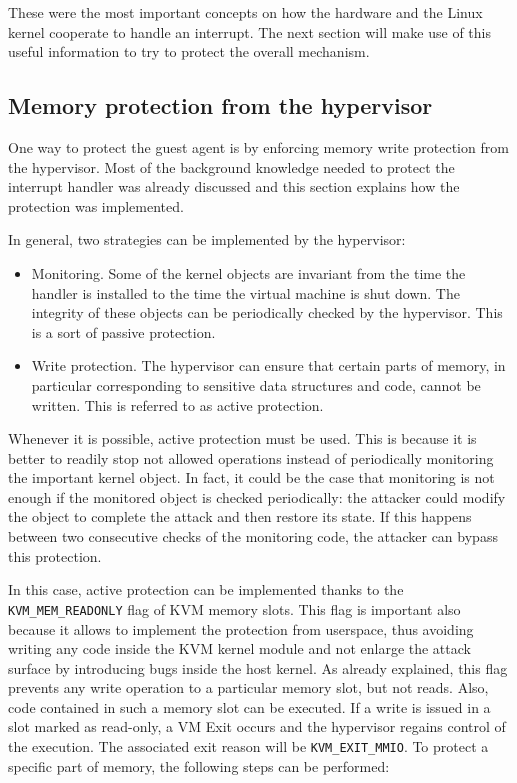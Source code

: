 \par 
These were the most important concepts on how the hardware and the Linux kernel cooperate to handle an interrupt. The next section will make use of this useful information to try to protect the overall mechanism. 
\subsection{Memory protection from the hypervisor}
One way to protect the guest agent is by enforcing memory write protection from the hypervisor. Most of the background knowledge needed to protect the interrupt handler was already discussed and this section explains how the protection was implemented.
\par 
In general, two strategies can be implemented by the hypervisor:
\begin{itemize}
    \item Monitoring. Some of the kernel objects are invariant from the time the handler is installed to the time the virtual machine is shut down. The integrity of these objects can be periodically checked by the hypervisor. This is a sort of passive protection. 
    \item Write protection. The hypervisor can ensure that certain parts of memory, in particular corresponding to sensitive data structures and code, cannot be written. This is referred to as active protection. 
\end{itemize}
Whenever it is possible, active protection must be used. This is because it is better to readily stop not allowed operations instead of periodically monitoring the important kernel object. In fact, it could be the case that monitoring is not enough if the monitored object is checked periodically: the attacker could modify the object to complete the attack and then restore its state. If this happens between two consecutive checks of the monitoring code, the attacker can bypass this protection.
\par
In this case, active protection can be implemented thanks to the \texttt{KVM\_MEM\_READONLY} flag of KVM memory slots. This flag is important also because it allows to implement the protection from userspace, thus avoiding writing any code inside the KVM kernel module and not enlarge the attack surface by introducing bugs inside the host kernel. As already explained, this flag prevents any write operation to a particular memory slot, but not reads. Also, code contained in such a memory slot can be executed. If a write is issued in a slot marked as read-only, a VM Exit occurs and the hypervisor regains control of the execution. The associated exit reason will be \texttt{KVM\_EXIT\_MMIO}. To protect a specific part of memory, the following steps can be performed: 
